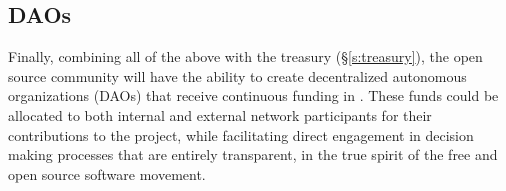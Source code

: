 \subsection{DAOs}
Finally, combining all of the above with the \oscoin{} treasury
(\S\ref{s:treasury}), the open source community will have the ability to create
decentralized autonomous organizations (DAOs) that receive continuous funding
in \oscoin{}.  These funds could be allocated to both internal and external
network participants for their contributions to the project, while facilitating
direct engagement in decision making processes that are entirely transparent,
in the true spirit of the free and open source software movement.

